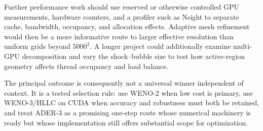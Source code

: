 Further performance work should use reserved or otherwise controlled GPU measurements,
hardware counters, and a profiler such as Nsight to separate cache, bandwidth, occupancy,
and allocation effects.  Adaptive mesh refinement would then be a more informative route
to larger effective resolution than uniform grids beyond \(5000^2\).  A longer project
could additionally examine multi-GPU decomposition and vary the shock--bubble size to test
how active-region geometry affects thread occupancy and load balance.

The principal outcome is consequently not a universal winner independent of context.
It is a tested selection rule: use WENO-2 when low cost is primary, use WENO-3/HLLC on CUDA
when accuracy and robustness must both be retained, and treat ADER-3 as a promising one-step
route whose numerical machinery is ready but whose implementation still offers substantial
scope for optimization.
